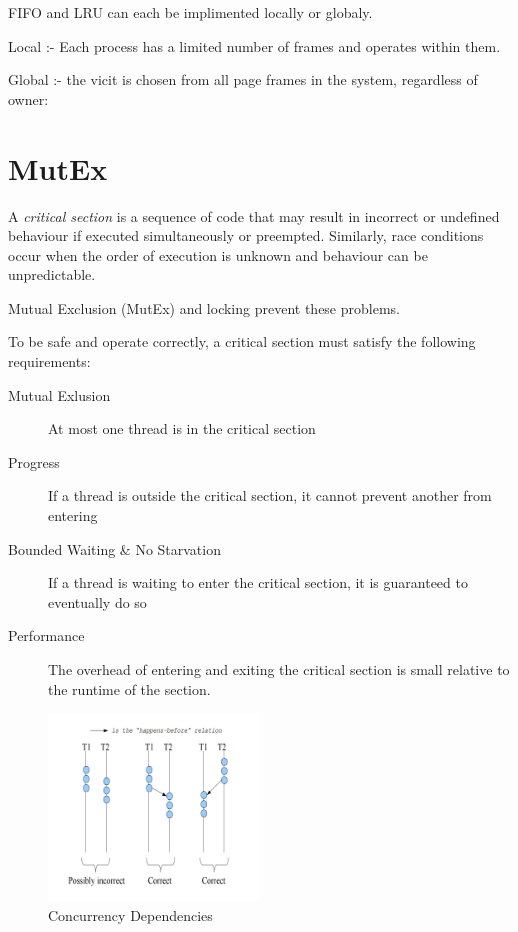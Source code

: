 \documentclass{article}
\begin{document}
\vspace{0.5cm}

FIFO and LRU can each be implimented locally or globaly.

Local :- Each process has a limited number of frames and operates within them.

Global :- the vicit is chosen from all page frames in the system, regardless of owner:



\filbreak
\section{MutEx}\label{mutex}

A \emph{critical section} is a sequence of code that may result in
incorrect or undefined behaviour if executed simultaneously or
preempted. Similarly, race conditions occur when the order of execution
is unknown and behaviour can be unpredictable.

Mutual Exclusion (MutEx) and locking prevent these problems.

To be safe and operate correctly, a critical section must satisfy the
following requirements:

\begin{description}
\item[Mutual Exlusion]
At most one thread is in the critical section
\item[Progress]
If a thread is outside the critical section, it cannot prevent another
from entering
\item[Bounded Waiting \& No Starvation]
If a thread is waiting to enter the critical section, it is guaranteed
to eventually do so
\item[Performance]
The overhead of entering and exiting the critical section is small
relative to the runtime of the section.
\end{description}

\begin{figure}[h!]
  \centering
  \includegraphics[width=0.5\textwidth]{correctConcurrency}
  \caption{Concurrency Dependencies}
\end{figure}
\end{document}
